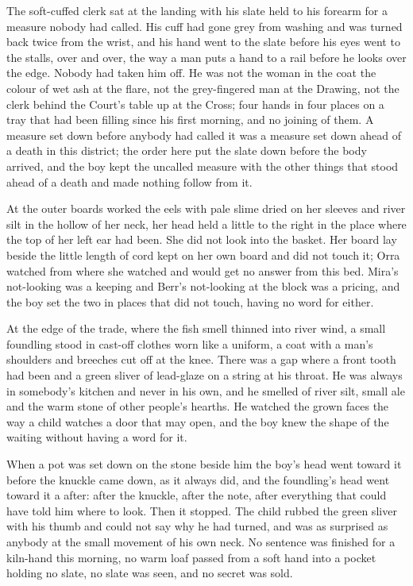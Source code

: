 The soft-cuffed clerk sat at the landing with his slate held to his forearm for a measure nobody had called. His cuff had gone grey from washing and was turned back twice from the wrist, and his hand went to the slate before his eyes went to the stalls, over and over, the way a man puts a hand to a rail before he looks over the edge. Nobody had taken him off. He was not the woman in the coat the colour of wet ash at the flare, not the grey-fingered man at the Drawing, not the clerk behind the Court's table up at the Cross; four hands in four places on a tray that had been filling since his first morning, and no joining of them. A measure set down before anybody had called it was a measure set down ahead of a death in this district; the order here put the slate down before the body arrived, and the boy kept the uncalled measure with the other things that stood ahead of a death and made nothing follow from it.

At the outer boards  worked the eels with pale slime dried on her sleeves and river silt in the hollow of her neck, her head held a little to the right in the place where the top of her left ear had been. She did not look into the basket. Her board lay beside the little length of cord  kept on her own board and did not touch it; Orra watched from where she watched and would get no answer from this bed. Mira's not-looking was a keeping and Berr's not-looking at the block was a pricing, and the boy set the two in places that did not touch, having no  word for either.

At the edge of the trade, where the fish smell thinned into river wind, a small foundling stood in cast-off clothes worn like a uniform, a coat with a man's shoulders and breeches cut off at the knee. There was a gap where a front tooth had been and a green sliver of lead-glaze on a string at his throat. He was always in somebody's kitchen and never in his own, and he smelled of river silt, small ale and the warm stone of other people's hearths. He watched the grown faces the way a child watches a door that may open, and the boy knew the shape of the waiting without having a word for it.

When a pot was set down on the stone beside him the boy's head went toward it before the knuckle came down, as it always did, and the foundling's head went toward it a  after: after the knuckle, after the note, after everything that could have told him where to look. Then it stopped. The child rubbed the green sliver with his thumb and could not say why he had turned, and was as surprised as anybody at the small movement of his own neck. No sentence was finished for a kiln-hand this morning, no warm loaf passed from a soft hand into a pocket holding no slate, no slate was seen, and no secret was sold.

